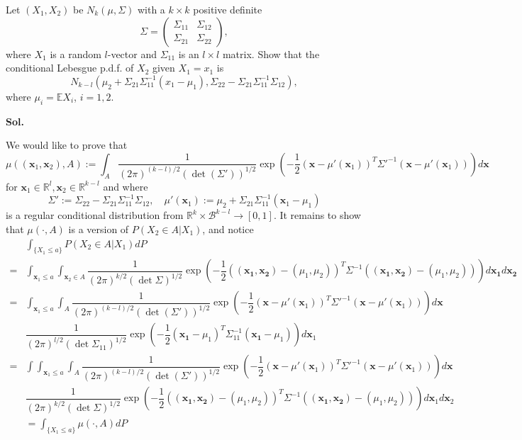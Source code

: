 \documentclass[lang=en,11pt,a4paper,citestyle=authoryear]{elegantpaper}
\newcommand{\R}{\mathbb{R}}
\newcommand{\B}{\mathcal{B}}
\newcommand{\E}{\mathbb{E}}
\begin{document}
Let $(X_1,X_2)$ be $N_k(\mu,\Sigma)$ with a $k\times k$
positive definite
\[
\Sigma=
\begin{pmatrix}
    \Sigma_{11} & \Sigma_{12}\\
    \Sigma_{21} & \Sigma_{22}
\end{pmatrix},
\]
where $X_1$ is a random $l$-vector and $\Sigma_{11}$ is an
$l\times l$ matrix. Show that the conditional Lebesgue p.d.f.
of $X_2$ given $X_1=x_1$ is
\[
N_{k-l}\left(
    \mu_2+\Sigma_{21}\Sigma_{11}^{-1}(x_1-\mu_1),
    \Sigma_{22}-\Sigma_{21}\Sigma_{11}^{-1}\Sigma_{12}
\right),
\]
where $\mu_i=\E X_i$, $i=1,2$.
\par\vspace{0.5em}
\textbf{Sol.}\par
We would like to prove that
\[
\mu((\mathbf{x}_1,\mathbf{x}_2),A) := \int_A \dfrac{1}{(2\pi)^{(k-l)/2}\left(\det\left(\Sigma'\right)\right)^{1/2}}\exp\left(-\dfrac{1}{2}(\mathbf{x} - \mu'(\mathbf{x}_1))^T\Sigma'^{-1}(\mathbf{x} - \mu'(\mathbf{x}_1))\right) d\mathbf{x}
\]
for $\mathbf{x}_1\in\R^l, \mathbf{x}_2 \in \R^{k-l}$ and where
\[
\Sigma':=\Sigma_{22}-\Sigma_{21}\Sigma_{11}^{-1}\Sigma_{12},\quad \mu'(\mathbf{x}_1):= \mu_2+\Sigma_{21}\Sigma_{11}^{-1}(\mathbf{x}_1-\mu_1)
\]
is a regular conditional distribution from $\R^k\times \B^{k-l} \to [0,1]$. It remains to show that $\mu(\cdot,A)$ is a version of $P(X_2 \in A|X_1)$, and notice
\[
\begin{aligned}
    &\int_{\{X_1 \leq a\}} P(X_2 \in A|X_1)dP\\
    =& \int_{\mathbf{x}_1 \leq a}\int_{\mathbf{x}_2 \in A}\dfrac{1}{(2\pi)^{k/2}\left(\det \Sigma\right)^{1/2}}\exp\left(-\dfrac{1}{2}((\mathbf{x_1},\mathbf{x_2})-(\mu_1,\mu_2))^T\Sigma^{-1}((\mathbf{x_1},\mathbf{x_2})-(\mu_1,\mu_2))\right)d\mathbf{x_1}d\mathbf{x_2} \\
    =& \int_{\mathbf{x}_1\leq a}\int_A\dfrac{1}{(2\pi)^{(k-l)/2}\left(\det\left(\Sigma'\right)\right)^{1/2}}\exp\left(-\dfrac{1}{2}(\mathbf{x} - \mu'(\mathbf{x}_1))^T\Sigma'^{-1}(\mathbf{x} - \mu'(\mathbf{x}_1))\right) d\mathbf{x}\\
    &\dfrac{1}{(2\pi)^{l/2}\left(\det \Sigma_{11}\right)^{1/2}}\exp\left(-\dfrac{1}{2}(\mathbf{x_1}-\mu_1)^T\Sigma_{11}^{-1}(\mathbf{x_1}-\mu_1)\right)d\mathbf{x}_1\\
    =& \int\int_{\mathbf{x}_1\leq a}\int_A \dfrac{1}{(2\pi)^{(k-l)/2}\left(\det\left(\Sigma'\right)\right)^{1/2}}\exp\left(-\dfrac{1}{2}(\mathbf{x} - \mu'(\mathbf{x}_1))^T\Sigma'^{-1}(\mathbf{x} - \mu'(\mathbf{x}_1))\right) d\mathbf{x}\\
    &\dfrac{1}{(2\pi)^{k/2}\left(\det \Sigma\right)^{1/2}}\exp\left(-\dfrac{1}{2}((\mathbf{x_1},\mathbf{x_2})-(\mu_1,\mu_2))^T\Sigma^{-1}((\mathbf{x_1},\mathbf{x_2})-(\mu_1,\mu_2))\right)d\mathbf{x}_1d\mathbf{x}_2 \\
    &= \int_{\{X_1\leq a\}}\mu(\cdot,A)dP
\end{aligned}
\]
\end{document}
